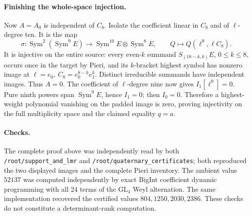 \paragraph{Finishing the whole-space injection.}
Now $A=A_0$ is independent of $C_8$. Isolate the coefficient linear in
$C_8$ and of $\ell$-degree ten. It is the map
\[
 \sigma:\operatorname{Sym}^2(\operatorname{Sym}^9 E)
       \longrightarrow \operatorname{Sym}^{10}E\otimes
                         \operatorname{Sym}^8 E,\qquad
 Q\longmapsto Q(\ell^9,\ell C_8).
\]
It is injective on the entire source: every even-$k$ summand
$S_{(18-k,k)}E$, $0\le k\le8$, occurs once in the target by Pieri,
and its $k$-bracket highest symbol has nonzero image at
$\ell=e_0,\ C_8=e_0^{8-k}e_1^k$. Distinct irreducible summands have
independent images. Thus $A=0$.
The coefficient of $\ell$-degree nine now gives $I_1[\ell^9]=0$.
Pure ninth powers span $\operatorname{Sym}^9 E$, hence $I_1=0$;
then $I_0=0$. Therefore a highest-weight polynomial vanishing on the
padded image is zero, proving injectivity on the full multiplicity
space and the claimed equality $q=a$.

\paragraph{Checks.}
The complete proof above was independently read by both
\texttt{/root/support\_and\_lmr} and
\texttt{/root/quaternary\_certificates}; both reproduced the two
displayed images and the complete Pieri inventory.
The ambient value $52137$ was computed independently by exact
BigInt coefficient dynamic programming with all 24 terms of the
$\mathrm{GL}_4$ Weyl alternation. The same implementation recovered
the certified values $804,1250,2030,2386$.
These checks do not constitute a determinant-rank computation.
